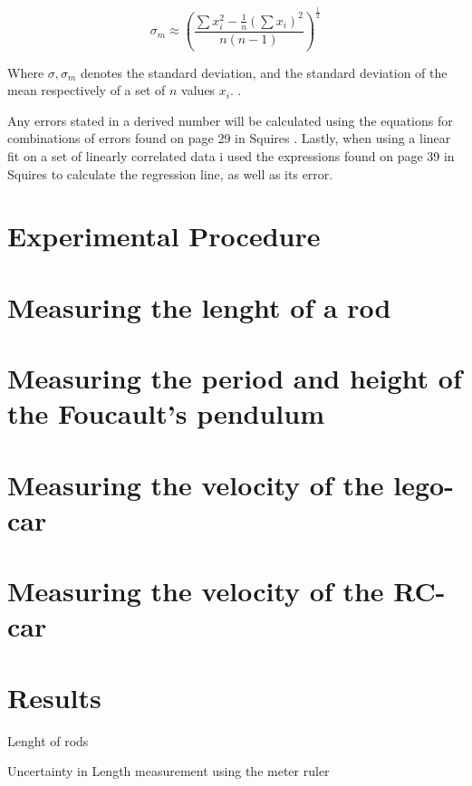 \documentclass[%
 reprint,
 amsmath,amssymb,
 aps,
]{revtex4-1}
\begin{document}
    \begin{equation}
      \label{eqn:sigma_m}
      \sigma_m \approx \left(
      \frac{\sum x_i^2 - \frac{1}{n}(\sum x_i)^2}
      {n(n - 1)}
      \right)^\frac{1}{2}
    \end{equation}

    Where $\sigma, \sigma_m$ denotes the standard deviation, and the standard deviation of the mean respectively of a set of $n$ values $x_i$. \cite{squires}.

    Any errors stated in a derived number will be calculated using the equations for combinations of errors found on page 29 in Squires \cite{squires}. Lastly, when using a linear fit on a set of linearly correlated data i used the expressions found on page 39 in Squires \cite{squires} to calculate the regression line, as well as its error.

\section{\label{sec:exp_proced}Experimental Procedure}
  \section{Measuring the lenght of a rod}
  \section{Measuring the period and height of the Foucault's pendulum}
  \section{Measuring the velocity of the lego-car}
  \section{Measuring the velocity of the RC-car}

\section{\label{sec:data} Results}
  \begin{table}[h!]
    \center
    \caption{Lenght of rods}
    \label{tab:lenrods}
    
  \end{table}

  \begin{table}[h!]
    \center
    \caption{Uncertainty in Length measurement using the meter ruler}
    \label{tab:uncert}
    
  \end{table}
  
\end{document}
